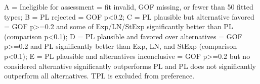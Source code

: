 \begin{flushleft}\footnotesize A = Ineligible for assessment = fit invalid, GOF missing, or fewer than 50 fitted types; B = PL rejected = GOF p<0.2; C = PL plausible but alternative favored = GOF p>=0.2 and some of Exp/LN/StExp significantly better than PL (comparison p<0.1); D = PL plausible and favored over alternatives = GOF p>=0.2 and PL significantly better than Exp, LN, and StExp (comparison p<0.1); E = PL plausible and alternatives inconclusive = GOF p>=0.2 but no considered alternative significantly outperforms PL and PL does not significantly outperform all alternatives. TPL is excluded from preference.\end{flushleft}
